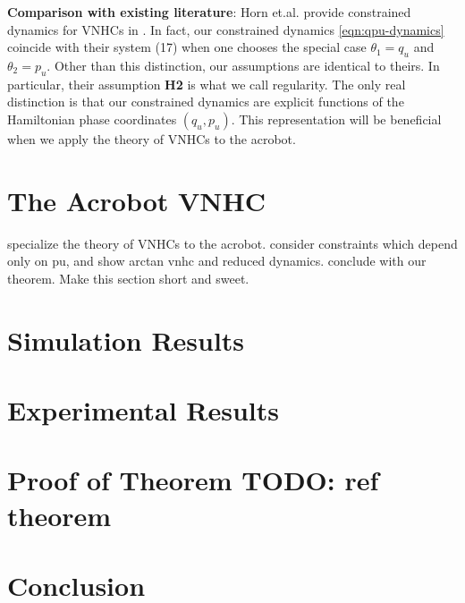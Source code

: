 \documentclass[journal,twoside,web]{ieeecolor}
\begin{document}
\textbf{Comparison with existing literature}: Horn et.al. provide constrained
dynamics for VNHCs in \cite{nhvc_incline_walking}.
In fact, our constrained dynamics \eqref{eqn:qpu-dynamics} coincide with their
system (17) when one chooses the special case \(\theta_1 = q_u\) and 
\(\theta_2 = p_u\).
Other than this distinction, our assumptions are identical to theirs.
In particular, their assumption \textbf{H2} is what we call
regularity.
The only real distinction is that our constrained dynamics
are explicit functions of the Hamiltonian phase coordinates
\((q_u,p_u)\).
This representation will be beneficial when we apply the theory of VNHCs to the
acrobot.

\section{The Acrobot VNHC}\label{sec:acrobot}
specialize the theory of VNHCs to the acrobot. consider constraints which depend
only on pu, and show arctan vnhc and reduced dynamics. conclude with our
theorem. Make this section short and sweet.

\section{Simulation Results}\label{sec:simulations}

\section{Experimental Results}\label{sec:experiments}

\section{Proof of Theorem \textbf{TODO: ref theorem}}\label{sec:proof}

\section{Conclusion}\label{sec:conclusion}



\end{document}
